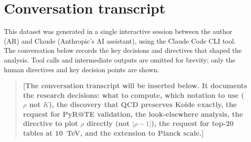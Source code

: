 \documentclass[11pt,a4paper]{article}
\begin{document}
\section{Conversation transcript}
\label{app:conversation}

This dataset was generated in a single interactive session between the
author (AR) and Claude (Anthropic's AI assistant), using the Claude Code
CLI tool. The conversation below records the key decisions and directives
that shaped the analysis. Tool calls and intermediate outputs are omitted
for brevity; only the human directives and key decision points are shown.

\bigskip

\begin{quote}
\small
\textbf{[The conversation transcript will be inserted below.
It documents the research decisions: what to compute, which notation
to use ($\rho$ not $K$), the discovery that QCD preserves Koide exactly,
the request for PyR@TE validation, the look-elsewhere analysis,
the directive to plot $\rho$ directly (not $|\rho-1|$), the request
for top-20 tables at 10~TeV, and the extension to Planck scale.]}
\end{quote}

\end{document}
